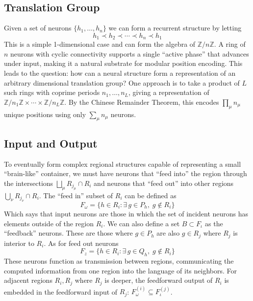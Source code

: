 \documentclass[11pt]{article}
\begin{document}
\subsection{Translation Group}\label{subsec:rec}
Given a set of neurons $\{h_1, \ldots, h_n\}$ we can form a recurrent structure by letting
\begin{equation}
    h_1 \prec h_2 \prec \cdots \prec h_n \prec h_1
\end{equation}
This is a simple 1-dimensional case and can form the algebra of $\mathbb{Z}/n\mathbb{Z}$. A ring of $n$ neurons with cyclic connectivity supports a single ``active phase'' that advances under input, making it a natural substrate for modular position encoding. This leads to the question: how can a neural structure form a representation of an arbitrary dimensional translation group? One approach is to take a product of $L$ such rings with coprime periods $n_1, \ldots, n_L$, giving a representation of $\mathbb{Z}/n_1\mathbb{Z} \times \cdots \times \mathbb{Z}/n_L\mathbb{Z}$. By the Chinese Remainder Theorem, this encodes $\prod_\mu n_\mu$ unique positions using only $\sum_\mu n_\mu$ neurons.



\subsection{Input and Output}
To eventually form complex regional structures capable of representing a small ``brain-like'' container, we must have neurons that ``feed into'' the region through the intersections $\bigsqcup_\mu R_{j_\mu} \cap R_i$ and neurons that ``feed out'' into other regions $\bigcup_\nu R_{j_\nu} \cap R_i$. The ``feed in'' subset of $R_i$ can be defined as
\begin{equation}
    F_\omega = \{h \in R_i : \exists\, g \in P_h,\; g \notin R_i \}
\end{equation}
Which says that input neurons are those in which the set of incident neurons has elements outside of the region $R_i$. We can also define a set $B \subset F_\iota$ as the ``feedback'' neurons. These are those where $g \in P_h$ are also $g \in R_j$ where $R_j$ is interior to $R_i$. As for feed out neurons
\begin{equation}
    F_z = \{h \in R_i : \exists\, g \in Q_h,\; g \notin R_i \}
\end{equation}
These neurons function as transmission between regions, communicating the computed information from one region into the language of its neighbors. For adjacent regions $R_i, R_j$ where $R_j$ is deeper, the feedforward output of $R_i$ is embedded in the feedforward input of $R_j$: $F_\omega^{(i)} \subseteq F_\iota^{(j)}$.\\ 
\end{document}
